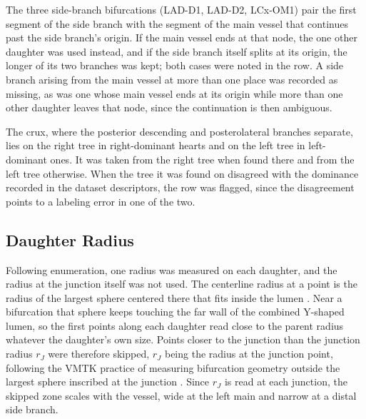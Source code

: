 The three side-branch bifurcations (LAD-D1, LAD-D2, LCx-OM1) pair the first segment of the side branch with the segment of the main vessel that continues past the side branch's origin.
If the main vessel ends at that node, the one other daughter was used instead, and if the side branch itself splits at its origin, the longer of its two branches was kept; both cases were noted in the row.
A side branch arising from the main vessel at more than one place was recorded as missing, as was one whose main vessel ends at its origin while more than one other daughter leaves that node, since the continuation is then ambiguous.

The crux, where the posterior descending and posterolateral branches separate, lies on the right tree in right-dominant hearts and on the left tree in left-dominant ones.
It was taken from the right tree when found there and from the left tree otherwise.
When the tree it was found on disagreed with the dominance recorded in the dataset descriptors, the row was flagged, since the disagreement points to a labeling error in one of the two.

\subsection{Daughter Radius}
\label{sec:daughter-ratio-radius}

Following enumeration, one radius was measured on each daughter, and the radius at the junction itself was not used.
The centerline radius at a point is the radius of the largest sphere centered there that fits inside the lumen \cite{antiga2008vmtk}.
Near a bifurcation that sphere keeps touching the far wall of the combined Y-shaped lumen, so the first points along each daughter read close to the parent radius whatever the daughter's own size.
Points closer to the junction than the junction radius $r_J$ were therefore skipped, $r_J$ being the radius at the junction point, following the VMTK practice of measuring bifurcation geometry outside the largest sphere inscribed at the junction \cite{antiga2008vmtk}.
Since $r_J$ is read at each junction, the skipped zone scales with the vessel, wide at the left main and narrow at a distal side branch.

